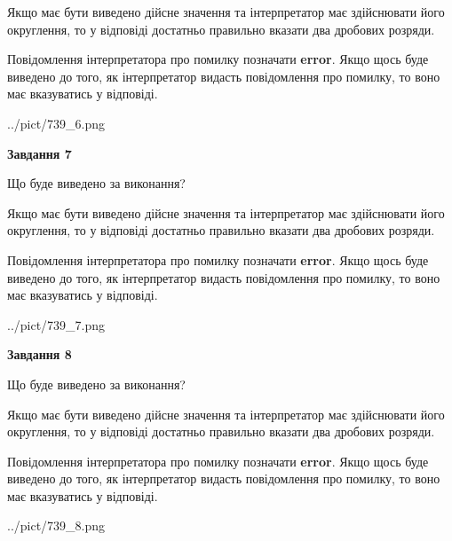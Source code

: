\documentclass[12pt, ukrainian]{article}
\begin{document}
{\begin {Large}
Якщо має бути виведено дійсне значення та інтерпретатор має здійснювати його округлення, 
то у відповіді достатньо правильно вказати два дробових розряди.

Повідомлення інтерпретатора про помилку позначати \textbf{error}.
Якщо щось буде виведено до того, як інтерпретатор видасть повідомлення про помилку, 
то воно має вказуватись у відповіді. \par

\begin{center}
	{../pict/739_6.png}
\end{center}
\newpage

{\begin {center}\textbf{Завдання 7}\end {center}}\par
Що буде виведено за виконання? \par

Якщо має бути виведено дійсне значення та інтерпретатор має здійснювати його округлення, 
то у відповіді достатньо правильно вказати два дробових розряди.

Повідомлення інтерпретатора про помилку позначати \textbf{error}.
Якщо щось буде виведено до того, як інтерпретатор видасть повідомлення про помилку, 
то воно має вказуватись у відповіді. \par

\begin{center}
	{../pict/739_7.png}
\end{center}
\newpage

{\begin {center}\textbf{Завдання 8}\end {center}}\par
Що буде виведено за виконання? \par

Якщо має бути виведено дійсне значення та інтерпретатор має здійснювати його округлення, 
то у відповіді достатньо правильно вказати два дробових розряди.

Повідомлення інтерпретатора про помилку позначати \textbf{error}.
Якщо щось буде виведено до того, як інтерпретатор видасть повідомлення про помилку, 
то воно має вказуватись у відповіді. \par

\begin{center}
	{../pict/739_8.png}
\end{center}
\newpage


\end{Large}}
\end{document}
